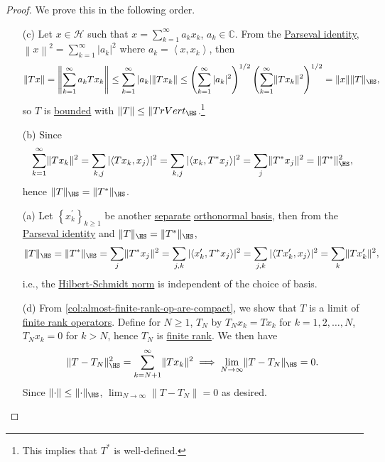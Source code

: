 \begin{proof}
	We prove this in the following order.
	\begin{enumerate}
		\item[(c)] Let \(x\in \mathcal{H} \) such that \(x = \sum_{k=1}^{\infty} a_{k} x_{k} \), \(a_{k} \in \mathbb{C} \). From the \hyperref[col:Parseval]{Parseval identity}, \(\left\lVert x\right\rVert ^{2} = \sum_{k=1}^{\infty}\left\vert a_{k}  \right\vert ^{2} \) where \(a_{k} = \left\langle x, x_{k}  \right\rangle \), then
		      \[
			      \lVert Tx \rVert
			      = \left\lVert \sum_{k=1}^{\infty} a_{k} Tx_{k} \right\rVert
			      \leq \sum_{k=1}^{\infty} \vert a_{k} \vert \lVert T x_{k} \rVert
			      \leq \left( \sum_{k=1}^{\infty} \vert a_{k} \vert ^2 \right) ^{1 / 2} \left( \sum_{k=1}^{\infty} \lVert T x_{k} \rVert ^{2} \right) ^{1 / 2}
			      = \lVert x \rVert \lVert T \rVert _{\HS},
		      \]
		      so \(T\) is \hyperref[def:bounded-linear-op]{bounded} with \(\lVert T \rVert \leq \lVert T\\rVert _{\HS }\).\footnote{This implies that \(T^{\ast} \) is well-defined.}
		\item[(b)] Since
		      \[
			      \sum_{k=1}^{\infty} \lVert Tx_{k} \rVert ^{2}
			      = \sum_{k, j} \vert \langle  T x_{k} , x_{j} \rangle \vert ^{2}
			      = \sum_{k, j} \vert \langle x_{k} , T^{\ast} x_{j} \rangle \vert ^{2}
			      = \sum_{j} \lVert T^{\ast} x_{j} \rVert ^{2}
			      = \lVert T^{\ast} \rVert ^{2} _{\HS },
		      \]
		      hence \(\lVert T\rVert _{\HS } = \lVert T^{\ast} \rVert _{\HS }\).
		\item[(a)] Let \(\left\{ x^\prime _k \right\}_{k\geq 1} \) be another \hyperref[def:separable]{separate} \hyperref[def:orthonormal-basis]{orthonormal basis}, then from the \hyperref[col:Parseval]{Parseval identity} and \(\lVert T \rVert _{\HS }= \lVert T^{\ast}  \rVert_{\HS}\),
		      \[
			      \lVert T \rVert _{\HS }
			      = \lVert T^{\ast}  \rVert_{\HS }
			      = \sum_{j} \lVert T^{\ast} x_{j} \rVert ^{2}
			      = \sum_{j, k} \vert \langle x^\prime _{k} , T^{\ast} x_{j} \rangle \vert ^{2}
			      = \sum_{j, k} \vert \langle T x^\prime _{k} , x_{j} \rangle \vert ^{2}
			      = \sum_{k} \lVert T x^\prime _{k} \rVert ^{2},
		      \]
		      i.e., the \hyperref[def:Hilbert-Schmidt-norm]{Hilbert-Schmidt norm} is independent of the choice of basis.
		\item[(d)] From \autoref{col:almost-finite-rank-op-are-compact}, we show that \(T\) is a limit of \hyperref[rmk:finite-rank-op]{finite rank operators}. Define for \(N \geq 1\), \(T_N\) by \(T_N x_k = Tx_k\) for \(k = 1, 2, \dots  , N\), \(T_{N}x_k = 0 \) for \(k > N\), hence \(T_N\) is \hyperref[rmk:finite-rank-op]{finite rank}. We then have
		      \[
			      \lVert T - T_{N} \rVert ^{2} _{\HS }
			      = \sum_{k=N+1}^{\infty} \lVert T x_{k} \rVert ^{2}
			      \implies \lim_{N \to \infty} \lVert T - T_{N} \rVert _{\HS } = 0.
		      \]
		      Since \(\lVert \cdot \rVert \leq \lVert \cdot \rVert _{\HS }\), \(\lim_{N \to \infty} \lVert T - T_N\rVert = 0\) as desired.
	\end{enumerate}
\end{proof}

